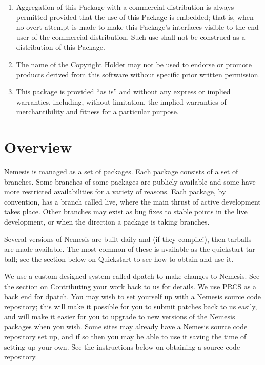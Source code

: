 \documentclass[a4paper]{article}
\begin{document}
\begin{enumerate}

\item Aggregation of this Package with a commercial distribution is always
permitted provided that the use of this Package is embedded; that is,
when no overt attempt is made to make this Package's interfaces visible
to the end user of the commercial distribution.  Such use shall not be
construed as a distribution of this Package.

\item The name of the Copyright Holder may not be used to endorse or promote
products derived from this software without specific prior written permission.

\item This package is provided ``as is'' and without any express or
implied warranties, including, without limitation, the implied
warranties of merchantibility and fitness for a particular purpose.

\end{enumerate}

\section{Overview}

Nemesis is managed as a set of packages. Each package consists of a
set of branches. Some branches of some packages are publicly
available and some have more restricted availabilities for a variety
of reasons. Each package, by convention, has a branch called live,
where the main thrust of active development takes place. Other
branches may exist as bug fixes to stable points in the live
development, or when the direction a package is taking branches.

Several versions of Nemesis are built daily and (if they compile!), then
tarballs are made available. The most common of these is available as the
quickstart tar ball; see the section below on Quickstart to see how to
obtain and use it.

We use a custom designed system called dpatch to make changes to
Nemesis. See the section on Contributing your work back to us for
details. We use PRCS as a back end for dpatch. You may wish to set
yourself up with a Nemesis source code repository; this will make it
possible for you to submit patches back to us easily, and will make it
easier for you to upgrade to new versions of the Nemesis packages when
you wish. Some sites may already have a Nemesis source code repository
set up, and if so then you may be able to use it saving the time of
setting up your own. See the instructions below on obtaining a source
code repository.
\end{document}

